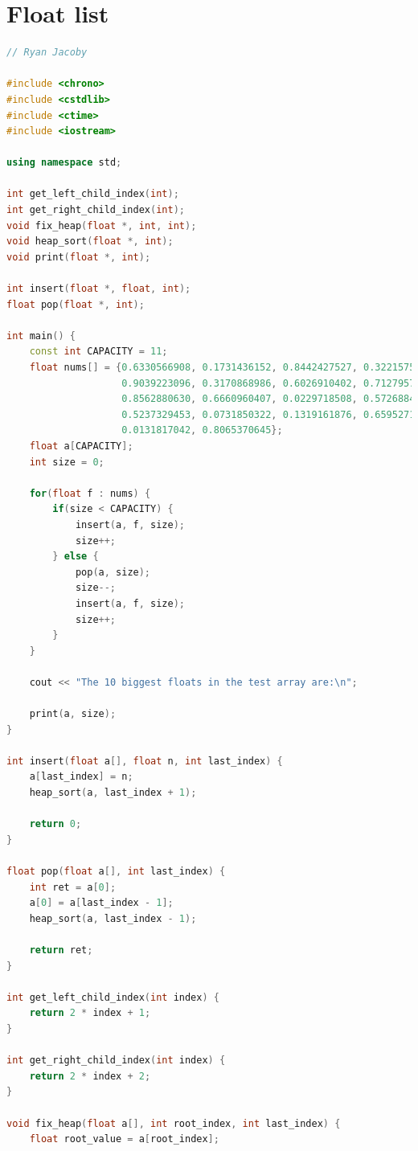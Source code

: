 \documentclass[letterpaper, 11pt]{article}
\begin{document}
\section{Float list}

\begin{lstlisting}[language=c++, caption=main.cpp]
// Ryan Jacoby

#include <chrono>
#include <cstdlib>
#include <ctime>
#include <iostream>

using namespace std;

int get_left_child_index(int);
int get_right_child_index(int);
void fix_heap(float *, int, int);
void heap_sort(float *, int);
void print(float *, int);

int insert(float *, float, int);
float pop(float *, int);

int main() {
    const int CAPACITY = 11;
    float nums[] = {0.6330566908, 0.1731436152, 0.8442427527, 0.3221575495, 0.5691910549, 0.9671822944, 0.5137396134, 
                    0.9039223096, 0.3170868986, 0.6026910402, 0.7127957556, 0.4026746783, 0.2412247231, 0.3896053414, 
                    0.8562880630, 0.6660960407, 0.0229718508, 0.5726884174, 0.1794473917, 0.9785428143, 0.9591225444, 
                    0.5237329453, 0.0731850322, 0.1319161876, 0.6595271659, 0.9627794760, 0.6963940613, 0.9510133140, 
                    0.0131817042, 0.8065370645};
    float a[CAPACITY];
    int size = 0;

    for(float f : nums) {
        if(size < CAPACITY) {
            insert(a, f, size);
            size++;
        } else {
            pop(a, size);
            size--;
            insert(a, f, size);
            size++;
        }
    }

    cout << "The 10 biggest floats in the test array are:\n";

    print(a, size);
}

int insert(float a[], float n, int last_index) {
    a[last_index] = n;
    heap_sort(a, last_index + 1);
    
    return 0;
}

float pop(float a[], int last_index) {
    int ret = a[0];
    a[0] = a[last_index - 1];
    heap_sort(a, last_index - 1);

    return ret;
}

int get_left_child_index(int index) {
    return 2 * index + 1;
}

int get_right_child_index(int index) {
    return 2 * index + 2;
}

void fix_heap(float a[], int root_index, int last_index) {
    float root_value = a[root_index];


\end{lstlisting}
\end{document}
